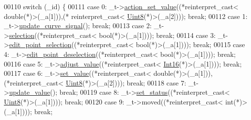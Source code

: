 \begin{DoxyCode}
00110         \textcolor{keywordflow}{switch} (\_id) \{
00111         \textcolor{keywordflow}{case} 0: \_t->\hyperlink{a00077_a886f07f2c612121bec703581f9398a10}{action\_set\_value}((*\textcolor{keyword}{reinterpret\_cast<} \textcolor{keywordtype}{double}(*)\textcolor{keyword}{>}(\_a[1])),(*\textcolor{keyword}{
      reinterpret\_cast<} \hyperlink{a00004_a979e3e23b9a449e69ab6a8a83b6042f8}{Uint8}(*)\textcolor{keyword}{>}(\_a[2]))); \textcolor{keywordflow}{break};
00112         \textcolor{keywordflow}{case} 1: \_t->\hyperlink{a00077_a49696761b5c638a3b2d58b16af9773e0}{update\_curve\_signal}(); \textcolor{keywordflow}{break};
00113         \textcolor{keywordflow}{case} 2: \_t->\hyperlink{a00077_a66bf875d43a16cf37527ab75c439fd8e}{selection}((*\textcolor{keyword}{reinterpret\_cast<} \textcolor{keywordtype}{bool}(*)\textcolor{keyword}{>}(\_a[1]))); \textcolor{keywordflow}{break};
00114         \textcolor{keywordflow}{case} 3: \_t->\hyperlink{a00077_adeebaace74ff3add2acd9147e96fc0a6}{edit\_point\_selection}((*\textcolor{keyword}{reinterpret\_cast<} \textcolor{keywordtype}{bool}(*)\textcolor{keyword}{>}(\_a[1]))); \textcolor{keywordflow}{break};
00115         \textcolor{keywordflow}{case} 4: \_t->\hyperlink{a00077_a105dff1f3ae7cfdcfabacd013428a501}{edit\_point\_deselection}((*\textcolor{keyword}{reinterpret\_cast<} \textcolor{keywordtype}{bool}(*)\textcolor{keyword}{>}(\_a[1]))); \textcolor{keywordflow}{
      break};
00116         \textcolor{keywordflow}{case} 5: \_t->\hyperlink{a00077_a521ac5143857dd652a0bafa77389fa81}{adjust\_value}((*\textcolor{keyword}{reinterpret\_cast<} \hyperlink{a00004_a3985266aecb120f269789241c170850c}{Int16}(*)\textcolor{keyword}{>}(\_a[1]))); \textcolor{keywordflow}{break};
00117         \textcolor{keywordflow}{case} 6: \_t->\hyperlink{a00077_ae3010d3de02715db2f443560d7d2a27b}{set\_value}((*\textcolor{keyword}{reinterpret\_cast<} \textcolor{keywordtype}{double}(*)\textcolor{keyword}{>}(\_a[1])),(*\textcolor{keyword}{reinterpret\_cast<} 
      \hyperlink{a00004_a979e3e23b9a449e69ab6a8a83b6042f8}{Uint8}(*)\textcolor{keyword}{>}(\_a[2]))); \textcolor{keywordflow}{break};
00118         \textcolor{keywordflow}{case} 7: \_t->\hyperlink{a00077_a4f62a01554ee8d975abe0cb136937695}{update\_value}(); \textcolor{keywordflow}{break};
00119         \textcolor{keywordflow}{case} 8: \_t->\hyperlink{a00077_a567902754e43310fe921b74c9d1862dd}{set\_status}((*\textcolor{keyword}{reinterpret\_cast<} \hyperlink{a00004_a979e3e23b9a449e69ab6a8a83b6042f8}{Uint8}(*)\textcolor{keyword}{>}(\_a[1]))); \textcolor{keywordflow}{break};
00120         \textcolor{keywordflow}{case} 9: \_t->moved((*\textcolor{keyword}{reinterpret\_cast<} \textcolor{keywordtype}{int}(*)\textcolor{keyword}{>}(\_a[1]))); \textcolor{keywordflow}{break};

\end{DoxyCode}
